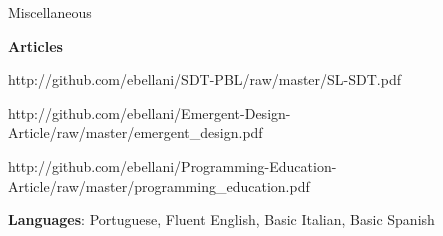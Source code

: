 \begin{rubric}{Miscellaneous}{

    \entry*
        \textbf{Articles}

        {http://github.com/ebellani/SDT-PBL/raw/master/SL-SDT.pdf}
        

        {http://github.com/ebellani/Emergent-Design-Article/raw/master/emergent_design.pdf}

        {http://github.com/ebellani/Programming-Education-Article/raw/master/programming_education.pdf} 


    \entry*
        \textbf{Languages}: Portuguese, Fluent English, Basic Italian, Basic Spanish



            
}    
\end{rubric}
